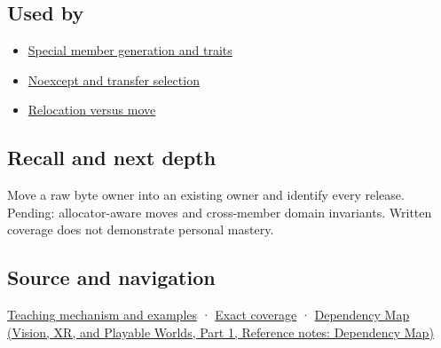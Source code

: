 \subsection{Used by}\label{appendix-5636651017c2-used-by}

\hypertarget{appendix-5636651017c2-used-by}{}

\begin{itemize}
\tightlist
\item
  \hyperref[appendix-42e02a12c694]{Special member generation and traits}
\item
  \hyperref[appendix-c746afaa47d1]{Noexcept and transfer selection}
\item
  \hyperref[appendix-adfd6397af8d]{Relocation versus move}
\end{itemize}

\subsection{Recall and next depth}\label{appendix-5636651017c2-recall-and-next-depth}

\hypertarget{appendix-5636651017c2-recall-and-next-depth}{}

Move a raw byte owner into an existing owner and identify every release. Pending: allocator-aware moves and cross-member domain invariants. Written coverage does not demonstrate personal mastery.

\subsection{Source and navigation}\label{appendix-5636651017c2-source-and-navigation}

\hypertarget{appendix-5636651017c2-source-and-navigation}{}

\hyperref[01-foundations-i-ch003-a-move-transfers-responsibility-while-the-source-survives]{Teaching mechanism and examples} · \hyperref[appendix-fd090d982a15-m009---parts-127-147]{Exact coverage} · \href{../07-Vision-XR-and-Playable-Worlds-P01/main.pdf\#nameddest=appendix-4ad47bdd269a}{Dependency Map (Vision, XR, and Playable Worlds, Part 1, Reference notes: Dependency Map)}
